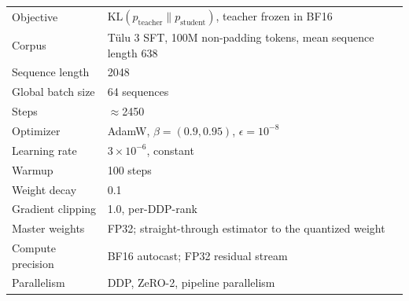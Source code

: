 \begin{tabular}{ll}
\toprule
Objective & $\mathrm{KL}(p_\text{teacher}\|p_\text{student})$, teacher frozen in BF16 \\
Corpus & T\"{u}lu 3 SFT, 100M non-padding tokens, mean sequence length 638 \\
Sequence length & 2048 \\
Global batch size & 64 sequences \\
Steps & $\approx$2450 \\
Optimizer & AdamW, $\beta=(0.9,0.95)$, $\epsilon=10^{-8}$ \\
Learning rate & $3\times10^{-6}$, constant \\
Warmup & 100 steps \\
Weight decay & 0.1 \\
Gradient clipping & 1.0, per-DDP-rank \\
Master weights & FP32; straight-through estimator to the quantized weight \\
Compute precision & BF16 autocast; FP32 residual stream \\
Parallelism & DDP, ZeRO-2, pipeline parallelism \\
\bottomrule
\end{tabular}
